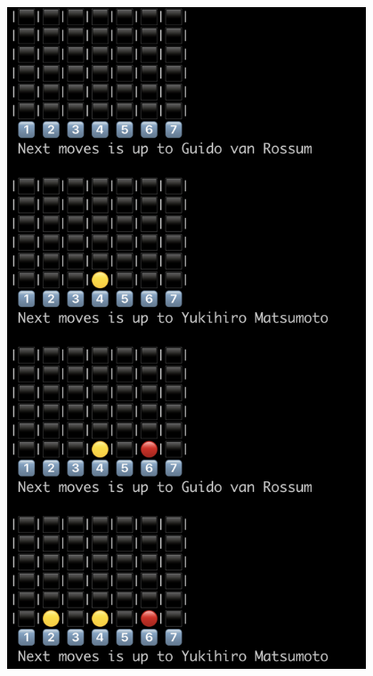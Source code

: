 \documentclass{beamer}
\begin{document}
  \begin{frame}
    \begin{columns}
        \centering
        \includegraphics[width=0.8\textwidth]{img/gamestart.png}
        \centering

\end{columns}
\end{frame}
\end{document}
